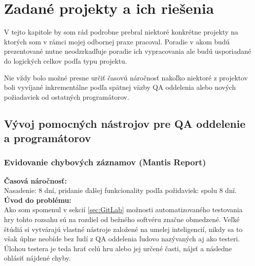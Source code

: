 \documentclass[slovak, bachelorpractice]{diploma}
\begin{document}
\chapter{Zadané projekty a ich riešenia}
\label{sec:Projects}
V tejto kapitole by som rád podrobne prebral niektoré konkrétne projekty na ktorých som v rámci mojej odbornej praxe pracoval. Poradie v akom budú prezentované nutne neodzrkadľuje poradie ich vypracovania ale budú usporiadané do logických celkov podľa typu projektu. 

Nie vždy bolo možné presne určiť časovú náročnosť nakoľko niektoré z projektov boli vyvíjané inkrementálne podľa spätnej väzby QA oddelenia alebo nových požiadaviek od ostatných programátorov.

\section{Vývoj pomocných nástrojov pre QA oddelenie a programátorov}
\label{sec:QACode}
\subsection{Evidovanie chybových záznamov (Mantis Report)}
\label{sec:Report}
\textbf{Časová náročnosť:} \\ Nasadenie: 8 dní, pridanie ďalšej funkcionality podľa požidaviek: spolu 8 dní.\\
\textbf{Úvod do problému:} \\ Ako som spomenul v sekcií \ref{sec:GitLab} možnosti automatizovaného testovania hry tohto rozsahu sú na rozdiel od bežného softvéru značne obmedzené. Veľké štúdiá si vytvárajú vlastné nástroje založené na umelej inteligencií, nikdy sa to však úplne neobíde bez ľudí z QA oddelenia ľudovo nazývaných aj ako testeri. Úlohou testera je teda hrať celú hru alebo jej určené časti, nájsť a následne ohlásiť nájdené chyby. 
\end{document}
